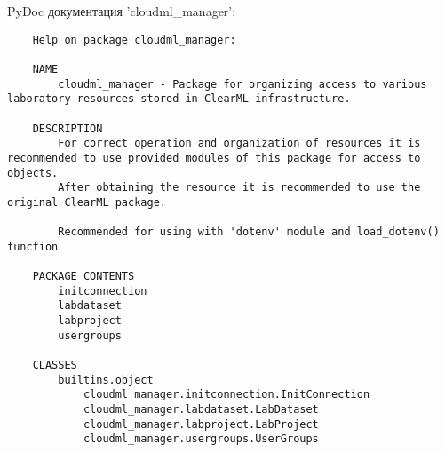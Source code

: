 PyDoc документация 'cloudml\_manager':
\begin{lstlisting}
	Help on package cloudml_manager:

	NAME
		cloudml_manager - Package for organizing access to various laboratory resources stored in ClearML infrastructure.
	
	DESCRIPTION
		For correct operation and organization of resources it is recommended to use provided modules of this package for access to objects.
		After obtaining the resource it is recommended to use the original ClearML package.
		
		Recommended for using with 'dotenv' module and load_dotenv() function
	
	PACKAGE CONTENTS
		initconnection
		labdataset
		labproject
		usergroups
	
	CLASSES
		builtins.object
			cloudml_manager.initconnection.InitConnection
			cloudml_manager.labdataset.LabDataset
			cloudml_manager.labproject.LabProject
			cloudml_manager.usergroups.UserGroups
		

\end{lstlisting}
